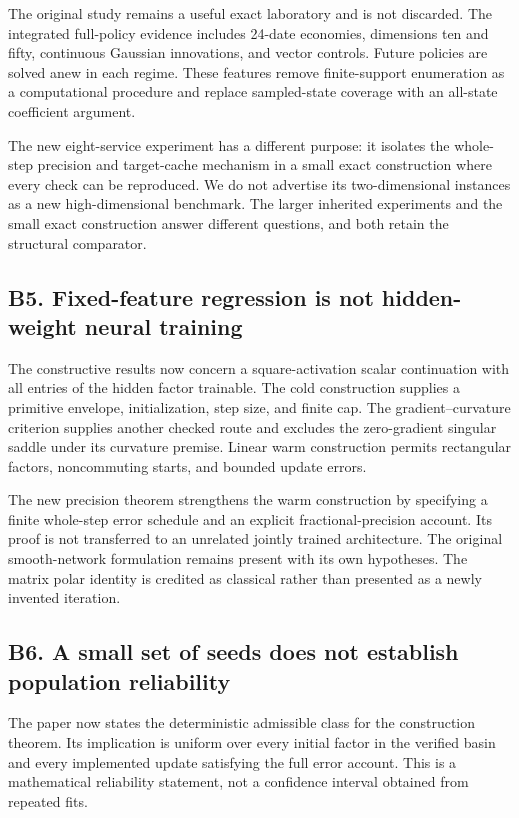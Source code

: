 \documentclass[ecta,nameyear,draft]{econsocart}
\theoremstyle{definition}
\theoremstyle{remark}
\begin{document}
The original study remains a useful exact laboratory and is not discarded. The integrated full-policy evidence includes 24-date economies, dimensions ten and fifty, continuous Gaussian innovations, and vector controls. Future policies are solved anew in each regime. These features remove finite-support enumeration as a computational procedure and replace sampled-state coverage with an all-state coefficient argument.

The new eight-service experiment has a different purpose: it isolates the whole-step precision and target-cache mechanism in a small exact construction where every check can be reproduced. We do not advertise its two-dimensional instances as a new high-dimensional benchmark. The larger inherited experiments and the small exact construction answer different questions, and both retain the structural comparator.

\subsection*{B5. Fixed-feature regression is not hidden-weight neural training}

The constructive results now concern a square-activation scalar continuation with all entries of the hidden factor trainable. The cold construction supplies a primitive envelope, initialization, step size, and finite cap. The gradient--curvature criterion supplies another checked route and excludes the zero-gradient singular saddle under its curvature premise. Linear warm construction permits rectangular factors, noncommuting starts, and bounded update errors.

The new precision theorem strengthens the warm construction by specifying a finite whole-step error schedule and an explicit fractional-precision account. Its proof is not transferred to an unrelated jointly trained architecture. The original smooth-network formulation remains present with its own hypotheses. The matrix polar identity is credited as classical rather than presented as a newly invented iteration.

\subsection*{B6. A small set of seeds does not establish population reliability}

The paper now states the deterministic admissible class for the construction theorem. Its implication is uniform over every initial factor in the verified basin and every implemented update satisfying the full error account. This is a mathematical reliability statement, not a confidence interval obtained from repeated fits.
\end{document}
